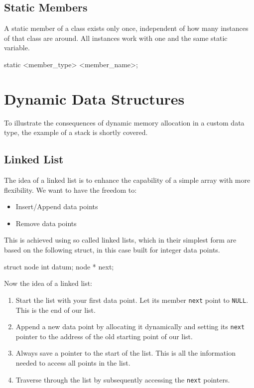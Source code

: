 \documentclass[10pt,a4paper]{scrartcl}
\begin{document}
\begin{multicols*}{2}
\subsection{Static Members}
\label{sec:StaticMembers}

A static member of a class exists only once, independent of how many instances of that class are around. All instances work with one and the same static variable.

\begin{TPCpp}
static <member_type> <member_name>;
\end{TPCpp}

\section{Dynamic Data Structures}
\label{sec:DynamicDataStructures}


To illustrate the consequences of dynamic memory allocation in a custom data type, the example of a stack is shortly covered.

\subsection{Linked List}
\label{sec:LinkedList}

The idea of a linked list is to enhance the capability of a simple array with more flexibility. We want to have the freedom to:

\begin{itemize}
\item Insert/Append data points
\item Remove data points
\end{itemize}

This is achieved using so called linked lists, which in their simplest form are based on the following struct, in this case built for integer data points.

\begin{TPCpp}
struct node {
	int datum;
	node * next;
}
\end{TPCpp}

Now the idea of a linked list:

\begin{enumerate}
\item Start the list with your first data point. Let its member \verb+next+ point to \verb+NULL+. This is the end of our list.
\item Append a new data point by allocating it dynamically and setting its \verb+next+ pointer to the address of the old starting point of our list.
\item Always save a pointer to the start of the list. This is all the information needed to access all points in the list.
\item Traverse through the list by subsequently accessing the \verb+next+ pointers.
\end{enumerate}


\end{multicols*}
\end{document}
